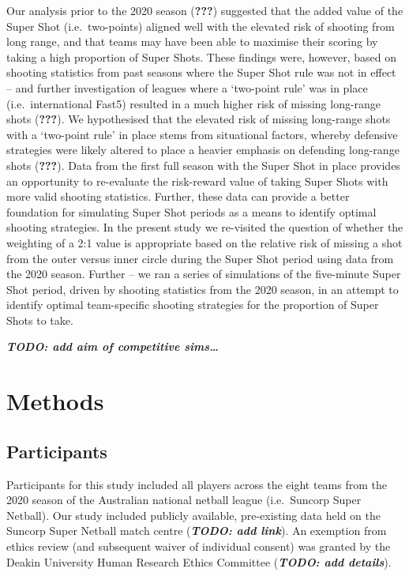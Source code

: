 \documentclass[]{elsarticle} %
\begin{document}
Our analysis prior to the 2020 season ({\textbf{???}}) suggested that
the added value of the Super Shot (i.e.~two-points) aligned well with
the elevated risk of shooting from long range, and that teams may have
been able to maximise their scoring by taking a high proportion of Super
Shots. These findings were, however, based on shooting statistics from
past seasons where the Super Shot rule was not in effect -- and further
investigation of leagues where a `two-point rule' was in place
(i.e.~international Fast5) resulted in a much higher risk of missing
long-range shots ({\textbf{???}}). We hypothesised that the elevated
risk of missing long-range shots with a `two-point rule' in place stems
from situational factors, whereby defensive strategies were likely
altered to place a heavier emphasis on defending long-range shots
({\textbf{???}}). Data from the first full season with the Super Shot in
place provides an opportunity to re-evaluate the risk-reward value of
taking Super Shots with more valid shooting statistics. Further, these
data can provide a better foundation for simulating Super Shot periods
as a means to identify optimal shooting strategies. In the present study
we re-visited the question of whether the weighting of a 2:1 value is
appropriate based on the relative risk of missing a shot from the outer
versus inner circle during the Super Shot period using data from the
2020 season. Further -- we ran a series of simulations of the
five-minute Super Shot period, driven by shooting statistics from the
2020 season, in an attempt to identify optimal team-specific shooting
strategies for the proportion of Super Shots to take.

\textbf{\emph{TODO: add aim of competitive sims\ldots{}}}

\hypertarget{methods}{%
\section{Methods}\label{methods}}

\hypertarget{participants}{%
\subsection{Participants}\label{participants}}

Participants for this study included all players across the eight teams
from the 2020 season of the Australian national netball league
(i.e.~Suncorp Super Netball). Our study included publicly available,
pre-existing data held on the Suncorp Super Netball match centre
(\textbf{\emph{TODO: add link}}). An exemption from ethics review (and
subsequent waiver of individual consent) was granted by the Deakin
University Human Research Ethics Committee (\textbf{\emph{TODO: add
details}}).
\end{document}
